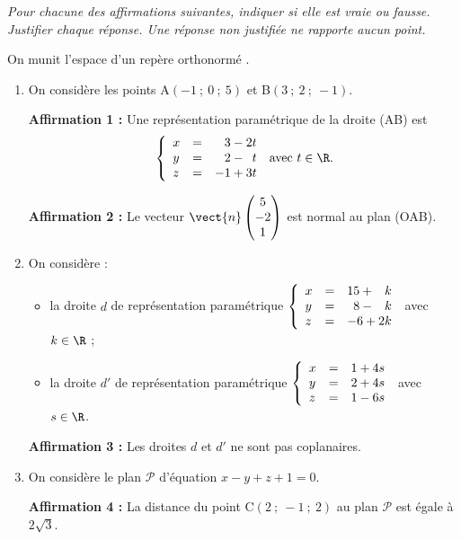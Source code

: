 \medskip

\emph{Pour chacune des affirmations suivantes, indiquer si elle est vraie ou fausse. Justifier chaque réponse. Une réponse non justifiée ne rapporte aucun point.}

\medskip

On munit l'espace d'un repère orthonormé \Oijk.

\medskip

\begin{enumerate}
\item On considère les points A$(-1~;~0~;~5)$ et B$(3~;~2~;~-1)$.

\textbf{Affirmation 1 :} Une représentation paramétrique de la droite (AB) est 
\[\left\{\begin{array}{l c l}
x &=& \phantom{-}3 - 2t\\
y &=&\phantom{-}2- \phantom{2}t\\
z&=&- 1 + 3t
\end{array}\right.\:\text{avec } t \in \R.\]

\textbf{Affirmation 2 :}  Le vecteur $\vect{n}\begin{pmatrix}5\\ -2\\1\end{pmatrix}$  est normal au plan (OAB).

\item  On considère :

\begin{itemize}[label=$\bullet~$]
\item la droite $d$ de représentation paramétrique $\left\{\begin{array}{l c l}x &=&15+ \phantom{-}k\\y &=& \phantom{1}8 - \phantom{-}k\\z &=& - 6 + 2k \end{array}\right.$ avec \:$k\in \R$ ;

\item la droite $d'$ de représentation paramétrique $\left\{\begin{array}{l c l}x&=&1 + 4s\\ y &=& 2 + 4s\\z&=&1- 6s \end{array}\right.$ avec $s \in \R$.
\end{itemize}

\textbf{Affirmation 3 :} Les droites $d$ et $d'$ ne sont pas coplanaires.
\item On considère le plan $\mathcal{P}$ d'équation $x- y + z + 1 = 0$.

\textbf{Affirmation 4 :}  La distance du point C$(2~;~-1~;~2)$ au plan $\mathcal{P}$ est égale à $2\sqrt 3$.
\end{enumerate}

\bigskip
